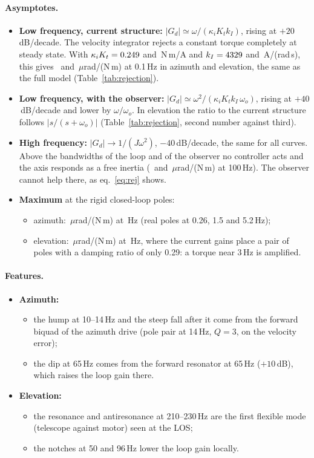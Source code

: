 \documentclass[10pt,a4paper]{article}
\numberwithin{equation}{section}
\begin{document}
\paragraph{Asymptotes.}
\begin{itemize}
\item \textbf{Low frequency, current structure:} $|G_d|\simeq\omega/(\kappa_iK_tk_I)$, rising at $+20$\,dB/decade. The velocity integrator rejects a constant torque completely at steady state. With $\kappa_iK_t=0.249$ and \ktkEl\,N\,m/A and $k_I=4329$ and \kIEl\,A/(rad\,s), this gives \lowCurAz\ and \lowCurEl\,$\mu$rad/(N\,m) at 0.1\,Hz in azimuth and elevation, the same as the full model (Table~\ref{tab:rejection}).
\item \textbf{Low frequency, with the observer:} $|G_d|\simeq\omega^2/(\kappa_iK_tk_I\,\omega_o)$, rising at $+40$\,dB/decade and lower by $\omega/\omega_o$. In elevation the ratio to the current structure follows $|s/(s+\omega_o)|$ (Table~\ref{tab:rejection}, second number against third).
\item \textbf{High frequency:} $|G_d|\to1/(J\omega^2)$, $-40$\,dB/decade, the same for all curves. Above the bandwidths of the loop and of the observer no controller acts and the axis responds as a free inertia (\highHundAz\ and \highHundEl\,$\mu$rad/(N\,m) at 100\,Hz). The observer cannot help there, as eq.~\eqref{eq:rej} shows.
\item \textbf{Maximum} at the rigid closed-loop poles:
  \begin{itemize}
  \item azimuth: \peakGAz\,$\mu$rad/(N\,m) at \peakFAz\,Hz (real poles at 0.26, 1.5 and 5.2\,Hz);
  \item elevation: \peakGEl\,$\mu$rad/(N\,m) at \peakFEl\,Hz, where the current gains place a pair of poles with a damping ratio of only 0.29: a torque near 3\,Hz is amplified.
  \end{itemize}
\end{itemize}

\paragraph{Features.}
\begin{itemize}
\item \textbf{Azimuth:}
  \begin{itemize}
  \item the hump at 10--14\,Hz and the steep fall after it come from the forward biquad of the azimuth drive (pole pair at 14\,Hz, $Q=3$, on the velocity error);
  \item the dip at 65\,Hz comes from the forward resonator at 65\,Hz ($+10$\,dB), which raises the loop gain there.
  \end{itemize}
\item \textbf{Elevation:}
  \begin{itemize}
  \item the resonance and antiresonance at 210--230\,Hz are the first flexible mode (telescope against motor) seen at the LOS;
  \item the notches at 50 and 96\,Hz lower the loop gain locally.
  \end{itemize}
\end{itemize}
\end{document}
